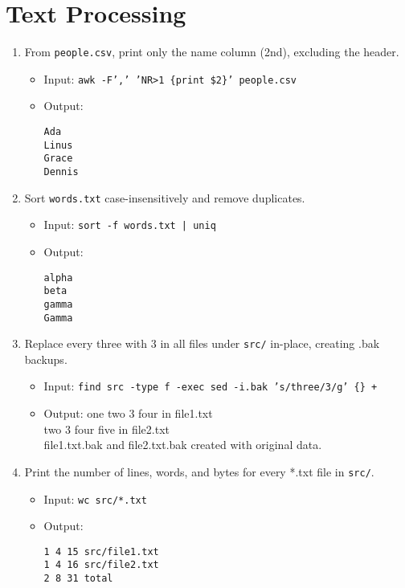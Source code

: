 \section{Text Processing}

\begin{enumerate}
\item From \texttt{people.csv}, print only the name column (2nd), excluding the header.
\begin{itemize}
\item Input: \texttt{awk -F',' 'NR>1 \{print \$2\}' people.csv}
\item Output:
\begin{verbatim}
Ada
Linus
Grace
Dennis
\end{verbatim}
\end{itemize}

\item Sort \texttt{words.txt} case-insensitively and remove duplicates.
\begin{itemize}
\item Input: \texttt{sort -f words.txt | uniq}
\item Output:
\begin{verbatim}
alpha
beta
gamma
Gamma
\end{verbatim}
\end{itemize}

\item Replace every three with 3 in all files under \texttt{src/} in-place, creating .bak backups.
\begin{itemize}
\item Input: \texttt{find src -type f -exec sed -i.bak 's/three/3/g' \{\} +}
\item Output: one two 3 four in file1.txt\\
two 3 four five in file2.txt\\
file1.txt.bak and file2.txt.bak created with original data.
\end{itemize}

\item Print the number of lines, words, and bytes for every *.txt file in \texttt{src/}.
\begin{itemize}
\item Input: \texttt{wc src/*.txt}
\item Output:
\begin{verbatim}
1 4 15 src/file1.txt
1 4 16 src/file2.txt
2 8 31 total
\end{verbatim}
\end{itemize}
\end{enumerate}


